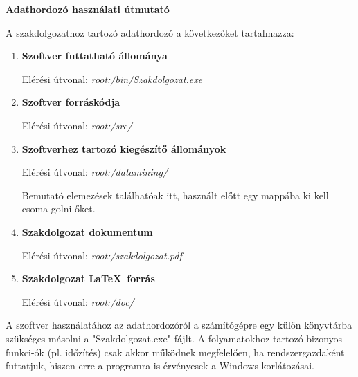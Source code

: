 \pagestyle{empty}

\noindent \textbf{\Large Adathordozó használati útmutató}

\vskip 1cm

\noindent A szakdolgozathoz tartozó adathordozó a következőket tartalmazza:
\begin{enumerate}
\item \textbf{Szoftver futtatható állománya}

Elérési útvonal: \textit{root:/bin/Szakdolgozat.exe}

\item \textbf{Szoftver forráskódja}

Elérési útvonal: \textit{root:/src/}
\item \textbf{Szoftverhez tartozó kiegészítő állományok}

Elérési útvonal: \textit{root:/datamining/}

Bemutató elemezések találhatóak itt, használt előtt egy mappába ki kell csoma\hyp{}golni őket.
\item \textbf{Szakdolgozat dokumentum}

Elérési útvonal: \textit{root:/szakdolgozat.pdf}
\item \textbf{Szakdolgozat \LaTeX\ forrás}

Elérési útvonal: \textit{root:/doc/}
\end{enumerate}

A szoftver használatához az adathordozóról a számítógépre egy külön könyvtárba szükséges másolni a "Szakdolgozat.exe" fájlt. A folyamatokhoz tartozó bizonyos funkci\hyp{}ók (pl. időzítés) csak akkor működnek megfelelően, ha rendszergazdaként futtatjuk, hiszen erre a programra is érvényesek a Windows korlátozásai.